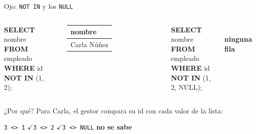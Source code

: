 \documentclass[aspectratio=169,10pt,c]{beamer}
\newcommand{\kw}[1]{\textcolor{utpRojo}{\textbf{#1}}}
\newcommand{\mal}[1]{{\setlength{\fboxsep}{1.2pt}\colorbox{utpRojo!18}{#1}}}
\newcommand{\si}{$\checkmark$}
\newenvironment{sqlcode}[1][.86\textwidth]
  {\begin{center}\begin{lrbox}{\sqlbuf}\begin{minipage}{#1}\ttfamily\footnotesize\vspace{6pt}\raggedright}
  {\vspace{6pt}\end{minipage}\end{lrbox}\colorbox{utpGrisClaro}{\usebox{\sqlbuf}}\end{center}}
\newcommand{\cab}[1]{\normalfont\bfseries #1}
\newcommand{\res}[3]{%
  \centering{\scriptsize\color{utpGris}resultado}\\[3pt]
  \footnotesize\ttfamily
  \begin{tabular}{#1}
  \toprule
  #2 \\
  \midrule
  #3
  \bottomrule
  \end{tabular}}
\begin{document}
\begin{frame}{Ojo: \texttt{NOT IN} y los \texttt{NULL}}
\begin{columns}[T,onlytextwidth]
\begin{sqlcode}[\dimexpr\textwidth-2\fboxsep\relax]
\kw{SELECT} nombre \kw{FROM} empleado\\
\kw{WHERE} id \kw{NOT IN} (1, 2);
\end{sqlcode}
\vspace{-0.1cm}
\res{l}{\cab{nombre}}{Carla Núñez \\}
\begin{sqlcode}[\dimexpr\textwidth-2\fboxsep\relax]
\kw{SELECT} nombre \kw{FROM} empleado\\
\kw{WHERE} id \kw{NOT IN} (1, 2, \mal{NULL});
\end{sqlcode}
\vspace{-0.1cm}
\\[6pt]
\small\textbf{ninguna fila}
\end{columns}
\vspace{0.3cm}
\small ¿Por qué? Para Carla, el gestor compara su id con cada valor de la lista:
\vspace{0.1cm}
\begin{center}
\small
\texttt{3 <> 1} \si \qquad \texttt{3 <> 2} \si \qquad \texttt{3 <> NULL} \textbf{no se sabe}
\end{center}
\vspace{0.1cm}
\end{frame}
\end{document}
